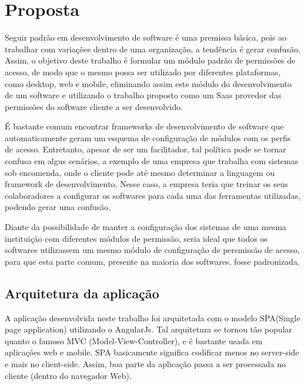 \chapter{Proposta}


Seguir padrão em desenvolvimento de software é uma premissa básica, pois ao trabalhar com variações dentro de uma organização, a tendência é gerar confusão. Assim, o objetivo deste trabalho é formular um módulo padrão de permissões de acesso, de modo que o mesmo possa ser utilizado por diferentes plataformas, como desktop, web e mobile, eliminando assim este módulo do desenvolvimento de um software e utilizando o trabalho proposto como um Saas provedor das permissões do software cliente a ser desenvolvido.


É bastante comum encontrar frameworks de desenvolvimento de software que automaticamente geram um esquema de configuração de módulos com os perfis de acesso. Entretanto, apesar de ser um facilitador, tal política pode se tornar confusa em algus cenários, a exemplo de uma empresa que trabalha com sistemas sob encomenda, onde o cliente pode até mesmo determinar a linguagem ou framework de desenvolvimento. Nesse caso, a empresa teria que treinar os seus colaboradores a configurar os softwares para cada uma das ferramentas utilizadas, podendo gerar uma confusão.


Diante da possibilidade de manter a configuração dos sistemas de uma mesma instituição com diferentes módulos de permissão, seria ideal que todos os softwares utilizassem um mesmo módulo de configuração de persmissão de acesso, para que esta parte comum, presente na maioria dos softwares, fosse padronizada.


\section{Arquitetura da aplicação}


A aplicação desenvolvida neste trabalho foi arquitetada com o modelo SPA(Single page application) utilizando o AngularJs. Tal arquitetura se tornou tão popular quanto o famoso MVC (Model-View-Controller), e é bastante usada em aplicações web e mobile. SPA basicamente significa codificar menos no server-side e mais no client-side. Assim, boa parte da aplicação passa a ser processada no cliente (dentro do navegador Web).


